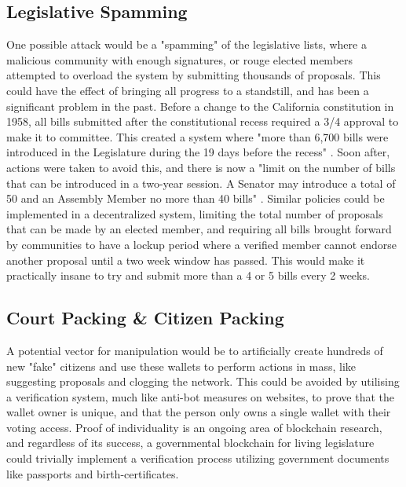 \documentclass[letterpaper,twocolumn]{article}
\begin{document}
\subsection*{Legislative Spamming}
One possible attack would be a "spamming" of the legislative lists, where a malicious community with enough signatures, or rouge elected members attempted to overload the system by submitting thousands of proposals.  This could have the effect of bringing all progress to a standstill, and has been a significant problem in the past.  Before a change to the California constitution in 1958, all bills submitted after the constitutional recess required a 3/4 approval to make it to committee.  This created a system where "more than 6,700 bills were introduced in the Legislature during the 19 days before the recess" \cite{Legislative_Process}.  Soon after, actions were taken to avoid this, and there is now a "limit on the number of bills that can be introduced in a two-year session. A Senator may introduce a total of 50 and an Assembly Member no more than 40 bills" \cite{Legislative_Process}.  Similar policies could be implemented in a decentralized system, limiting the total number of proposals that can be made by an elected member, and requiring all bills brought forward by communities to have a lockup period where a verified member cannot endorse another proposal until a two week window has passed.  This would make it practically insane to try and submit more than a 4 or 5 bills every 2 weeks.

\subsection*{Court Packing \& Citizen Packing}
A potential vector for manipulation would be to artificially create hundreds of new "fake" citizens and use these wallets to perform actions in mass, like suggesting proposals and clogging the network.  This could be avoided by utilising a verification system, much like anti-bot measures on websites, to prove that the wallet owner is unique, and that the person only owns a single wallet with their voting access. Proof of individuality is an ongoing area of blockchain research, and regardless of its success, a governmental blockchain for living legislature could trivially implement a verification process utilizing government documents like passports and birth-certificates.
\end{document}
